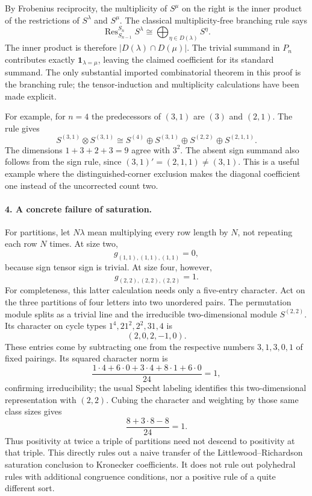 \documentclass[11pt]{article}
\begin{document}
By Frobenius reciprocity, the multiplicity of $S^\mu$ on the right is the inner product of the restrictions of $S^\lambda$ and $S^\mu$. The classical multiplicity-free branching rule says
\[
 \operatorname{Res}_{S_{n-1}}^{S_n}S^\lambda
 \cong\bigoplus_{\eta\in D(\lambda)}S^\eta.
\]
The inner product is therefore $|D(\lambda)\cap D(\mu)|$. The trivial summand in $P_n$ contributes exactly $\mathbf1_{\lambda=\mu}$, leaving the claimed coefficient for its standard summand. The only substantial imported combinatorial theorem in this proof is the branching rule; the tensor-induction and multiplicity calculations have been made explicit.

For example, for $n=4$ the predecessors of $(3,1)$ are $(3)$ and $(2,1)$. The rule gives
\[
 S^{(3,1)}\otimes S^{(3,1)}
 \cong S^{(4)}\oplus S^{(3,1)}\oplus S^{(2,2)}\oplus S^{(2,1,1)}.
\]
The dimensions $1+3+2+3=9$ agree with $3^2$. The absent sign summand also follows from the sign rule, since $(3,1)'=(2,1,1)\ne(3,1)$. This is a useful example where the distinguished-corner exclusion makes the diagonal coefficient one instead of the uncorrected count two.

\paragraph{4. A concrete failure of saturation.}
For partitions, let $N\lambda$ mean multiplying every row length by $N$, not repeating each row $N$ times. At size two,
\[
 g_{(1,1),(1,1),(1,1)}=0,
\]
because sign tensor sign is trivial. At size four, however,
\[
 g_{(2,2),(2,2),(2,2)}=1.
\]
For completeness, this latter calculation needs only a five-entry character. Act on the three partitions of four letters into two unordered pairs. The permutation module splits as a trivial line and the irreducible two-dimensional module $S^{(2,2)}$. Its character on cycle types $1^4,21^2,2^2,31,4$ is
\[
 (2,0,2,-1,0).
\]
These entries come by subtracting one from the respective numbers $3,1,3,0,1$ of fixed pairings. Its squared character norm is
\[
 \frac{1\cdot4+6\cdot0+3\cdot4+8\cdot1+6\cdot0}{24}=1,
\]
confirming irreducibility; the usual Specht labeling identifies this two-dimensional representation with $(2,2)$. Cubing the character and weighting by those same class sizes gives
\[
 \frac{8+3\cdot8-8}{24}=1.
\]
Thus positivity at twice a triple of partitions need not descend to positivity at that triple. This directly rules out a naive transfer of the Littlewood--Richardson saturation conclusion to Kronecker coefficients. It does not rule out polyhedral rules with additional congruence conditions, nor a positive rule of a quite different sort.
\end{document}
